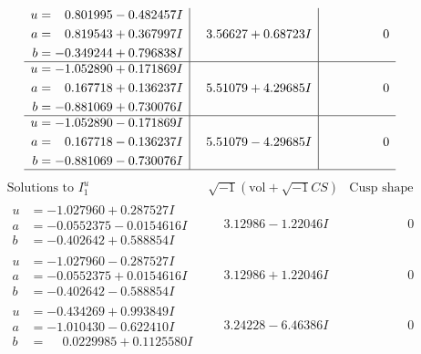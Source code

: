 \documentclass[1p]{elsarticle_modified}
\theoremstyle{definition}
\newcommand{\I}{\sqrt{-1}}
\begin{document}
$$\begin{array}{c|c|c}
\begin{aligned}
u &= \phantom{-}0.801995 - 0.482457 I \\
a &= \phantom{-}0.819543 + 0.367997 I \\
b &= -0.349244 + 0.796838 I\end{aligned}
 & \phantom{-}3.56627 + 0.68723 I & \phantom{-0.000000 } 0 \\ \hline\begin{aligned}
u &= -1.052890 + 0.171869 I \\
a &= \phantom{-}0.167718 + 0.136237 I \\
b &= -0.881069 + 0.730076 I\end{aligned}
 & \phantom{-}5.51079 + 4.29685 I & \phantom{-0.000000 } 0 \\ \hline\begin{aligned}
u &= -1.052890 - 0.171869 I \\
a &= \phantom{-}0.167718 - 0.136237 I \\
b &= -0.881069 - 0.730076 I\end{aligned}
 & \phantom{-}5.51079 - 4.29685 I & \phantom{-0.000000 } 0\\
 \hline 
 \end{array}$$\newpage$$\begin{array}{c|c|c}  
\text{Solutions to }I^u_{1}& \I (\text{vol} + \sqrt{-1}CS) & \text{Cusp shape}\\
 \hline 
\begin{aligned}
u &= -1.027960 + 0.287527 I \\
a &= -0.0552375 - 0.0154616 I \\
b &= -0.402642 + 0.588854 I\end{aligned}
 & \phantom{-}3.12986 - 1.22046 I & \phantom{-0.000000 } 0 \\ \hline\begin{aligned}
u &= -1.027960 - 0.287527 I \\
a &= -0.0552375 + 0.0154616 I \\
b &= -0.402642 - 0.588854 I\end{aligned}
 & \phantom{-}3.12986 + 1.22046 I & \phantom{-0.000000 } 0 \\ \hline\begin{aligned}
u &= -0.434269 + 0.993849 I \\
a &= -1.010430 - 0.622410 I \\
b &= \phantom{-}0.0229985 + 0.1125580 I\end{aligned}
 & \phantom{-}3.24228 - 6.46386 I & \phantom{-0.000000 } 0 \\ \hline\begin{aligned}

\end{aligned}
\end{array}$$
\end{document}
